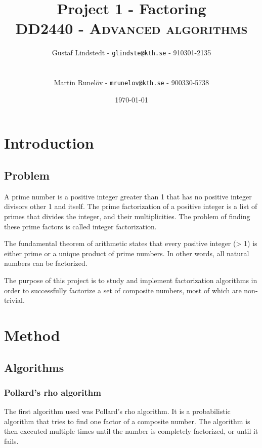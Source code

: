 \documentclass[paper=a4, fontsize=11pt,numbers=endperiod]{scrartcl} %
\title{	
\huge Project 1 - Factoring \\ %
\vspace{10pt}
\normalfont \normalsize 
\textsc{DD2440 - Advanced algorithms } \\ [25pt] %
}
\author{\vspace{-20pt} Gustaf Lindstedt - \nolinkurl{glindste@kth.se} - 910301-2135\\\\\\Martin Runelöv - \nolinkurl{mrunelov@kth.se} - 900330-5738}
\date{\vspace{8pt}\normalsize\today} %
\numberwithin{equation}{section} %
\numberwithin{figure}{section} %
\numberwithin{table}{section} %
\begin{document}
\maketitle %


\section{Introduction}

\subsection{Problem}
A prime number is a positive integer greater than 1 that has no positive integer divisors other 1 and itself.
The prime factorization of a positive integer is a list of primes that divides the integer, and their multiplicities.
The problem of finding these prime factors is called integer factorization.

The fundamental theorem of arithmetic states that every positive integer (> 1) is either prime or a unique product of prime numbers.
In other words, all natural numbers can be factorized.

The purpose of this project is to study and implement factorization algorithms in order to successfully factorize a set of composite numbers, most of which are non-trivial.



\section{Method}
\subsection{Algorithms}
\subsubsection{Pollard's rho algorithm}
The first algorithm used was Pollard's rho algorithm\cite{pollard}.
It is a probabilistic algorithm that tries to find one factor of a composite number.
The algorithm is then executed multiple times until the number is completely factorized, or until it fails.
\end{document}
